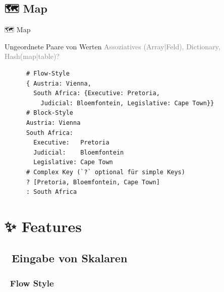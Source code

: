 \documentclass{beamer}
\begin{document}
\subsection{🗺 Map}

\begin{frame}[fragile]{🗺 Map}
  \begin{block}{Ungeordnete Paare von Werten}
    \textcolor{gray}{Assoziatives (Array|Feld), Dictionary, Hash(map|table)?}\\
    \begin{verbatim}
      # Flow-Style
      { Austria: Vienna,
        South Africa: {Executive: Pretoria,
          Judicial: Bloemfontein, Legislative: Cape Town}}
      # Block-Style
      Austria: Vienna
      South Africa:
        Executive:   Pretoria
        Judicial:    Bloemfontein
        Legislative: Cape Town
      # Complex Key (`?` optional für simple Keys)
      ? [Pretoria, Bloemfontein, Cape Town]
      : South Africa
    \end{verbatim}
  \end{block}
\end{frame}

\section{✨ Features}
\subsection{📝 Eingabe von Skalaren}

\subsubsection{🌊 Flow Style}
\end{document}

